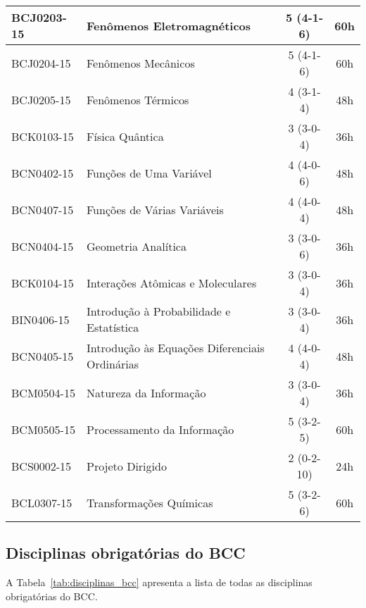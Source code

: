 \begin{table}[!h]
\begin{longtable}{|l|p{}|c|c|}
        \hline
        BCJ0203-15 & Fenômenos Eletromagnéticos & 5 (4-1-6) & 60h\\
        \hline
        BCJ0204-15 & Fenômenos Mecânicos & 5 (4-1-6) & 60h \\
        \hline
        BCJ0205-15 & Fenômenos Térmicos & 4 (3-1-4) & 48h\\
        \hline
        BCK0103-15 & Física Quântica & 3 (3-0-4) & 36h\\
        \hline
        BCN0402-15 & Funções de Uma Variável & 4 (4-0-6) & 48h\\
        \hline
        BCN0407-15 & Funções de Várias Variáveis & 4 (4-0-4) & 48h \\
        \hline
        BCN0404-15 & Geometria Analítica & 3 (3-0-6) & 36h\\
        \hline
        BCK0104-15 & Interações Atômicas e Moleculares & 3 (3-0-4) & 36h\\
        \hline
        BIN0406-15 & Introdução à Probabilidade e Estatística & 3 (3-0-4) & 36h\\
        \hline
        BCN0405-15 & Introdução às Equações Diferenciais Ordinárias & 4 (4-0-4) & 48h \\
        \hline
        BCM0504-15 & Natureza da Informação & 3 (3-0-4) & 36h\\
        \hline
        BCM0505-15 & Processamento da Informação & 5 (3-2-5) & 60h\\
        \hline
        BCS0002-15 & Projeto Dirigido & 2 (0-2-10) & 24h\\
        \hline
        BCL0307-15 & Transformações Químicas & 5 (3-2-6) & 60h\\
        \hline
    \end{longtable}
\end{table}


\subsection{Disciplinas obrigatórias do BCC}

A Tabela~\ref{tab:disciplinas_bcc} apresenta a lista de todas as
disciplinas obrigatórias do BCC.

